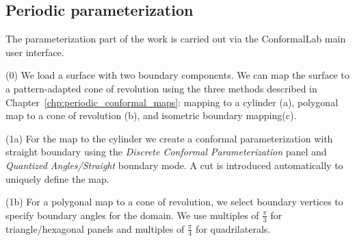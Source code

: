 \documentclass[Thesis.tex]{subfiles}
\begin{document}
\subsection{Periodic parameterization}
The parameterization part of the work is carried out via the {\sc ConformalLab} main user interface. 

\begin{compactenum}[(1)]
\item[(0)] We load a surface with two boundary components. We can map the surface to a pattern-adapted cone of revolution using the three methods described in Chapter~\ref{chp:periodic_conformal_maps}: mapping to a cylinder (a), polygonal map to a cone of revolution (b), and isometric boundary mapping(c).
\item[(1a)] For the map to the cylinder we create a conformal parameterization with straight boundary using the \emph{Discrete Conformal Parameterization} panel and \emph{Quantized Angles/Straight} boundary mode. A cut is introduced automatically to uniquely define the map.\\

\begin{center}
\begin{minipage}{\linewidth}
            \centering
            \label{fig:periodic_algorithm1a}
\end{minipage}
\end{center}            

\item[(1b)] For a polygonal map to a cone of revolution, we select boundary vertices to specify boundary angles for the domain. We use multiples of $\frac{\pi}{3}$ for triangle/hexagonal panels and multiples of $\frac{\pi}{4}$ for quadrilaterals.


\end{compactenum}
\end{document}

